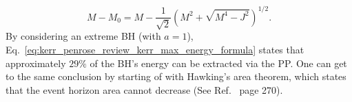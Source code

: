 %
\begin{equation}
  M - M_0 = M - \frac{1}{\sqrt{2}}\left( M^2 + \sqrt{M^4 - J^2} \right)^{1/2}.
  \label{eq:kerr_penrose_review_kerr_max_energy_formula}
\end{equation}
%
By considering an extreme BH (with $a=1$), Eq.~\eqref{eq:kerr_penrose_review_kerr_max_energy_formula} states that approximately $29\%$ of the BH's energy can be extracted via the PP. One can get to the same conclusion by starting of with Hawking's area theorem, which states that the event horizon area cannot decrease (See Ref.~\cite{carroll} page 270).